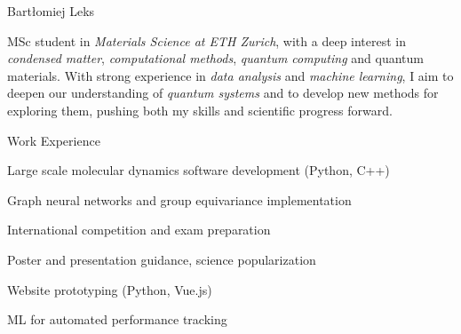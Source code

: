 \documentclass{./cv}
\begin{document}
\begin{cvheader}{Bartłomiej Leks}
    \begin{horizontallist}
        \item {}
        \item {}
        \item {}
        \item {}
    \end{horizontallist}
    \begin{horizontallist}
        \item {}
        \item \address{Zürich, Switzerland}
    \end{horizontallist}
\end{cvheader}

\vspace{-1em}
\begin{cvsection}{}
    \begin{addmargin}[0pt]{\contentindent}
MSc student in \emph{Materials Science at ETH Zurich}, with a deep interest in \emph{condensed matter}, \emph{computational methods}, \emph{quantum computing} and quantum materials. With strong experience in \emph{data analysis} and \emph{machine learning}, I aim to deepen our understanding of \emph{quantum systems} and to develop new methods for exploring them, pushing both my skills and scientific progress forward.
    \end{addmargin}
\end{cvsection}


\begin{cvsection}{Work Experience}
    \begin{descrlist}
        \item Large scale molecular dynamics software development (Python, C++)
        \item Graph neural networks and group equivariance implementation
    \end{descrlist}
    \begin{descrlist}
        \item International competition and exam preparation
        \item Poster and presentation guidance, science popularization
    \end{descrlist}
    \begin{descrlist}
        \item Website prototyping (Python, Vue.js)
        \item ML for automated performance tracking
    \end{descrlist}
\end{cvsection}
\end{document}
